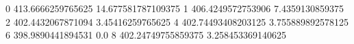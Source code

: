 0 413.6666259765625 14.677581787109375
1 406.4249572753906 7.4359130859375
2 402.4432067871094 3.45416259765625
4 402.74493408203125 3.755889892578125
6 398.9890441894531 0.0
8 402.24749755859375 3.258453369140625
